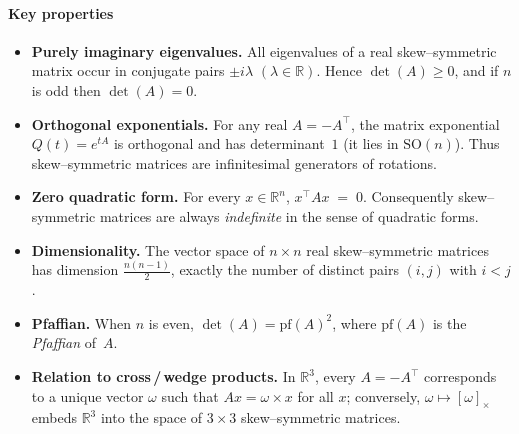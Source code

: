 \paragraph{Key properties}
\begin{itemize}
    \item \textbf{Purely imaginary eigenvalues.}  
          All eigenvalues of a real skew--symmetric matrix occur in conjugate pairs $\pm i\lambda$ $(\lambda \in \mathbb{R})$.  
          Hence $\det(A) \ge 0$, and if $n$ is odd then $\det(A)=0$.
          
    \item \textbf{Orthogonal exponentials.}  
          For any real $A=-A^\top$, the matrix exponential $Q(t)=e^{tA}$ is orthogonal and has determinant~$1$ (it lies in $\mathrm{SO}(n)$).  
          Thus skew--symmetric matrices are infinitesimal generators of rotations.

    \item \textbf{Zero quadratic form.}  
          For every $x\in\mathbb{R}^n$, 
          \(
          x^\top A x \;=\;0.
          \)
          Consequently skew--symmetric matrices are always \emph{indefinite} in the sense of quadratic forms.

    \item \textbf{Dimensionality.}  
          The vector space of $n \times n$ real skew--symmetric matrices has dimension $\tfrac{n(n-1)}{2}$, exactly the number of distinct pairs $(i,j)$ with $i<j$.

    \item \textbf{Pfaffian.}  
          When $n$ is even, $\det(A)=\mathrm{pf}(A)^2$, where $\mathrm{pf}(A)$ is the \emph{Pfaffian} of~$A$.

    \item \textbf{Relation to cross\,/\,wedge products.}  
          In $\mathbb{R}^3$, every $A=-A^\top$ corresponds to a unique vector $\omega$ such that $A x = \omega \times x$ for all $x$; conversely, $\omega \mapsto [\omega]_\times$ embeds $\mathbb{R}^3$ into the space of $3\times 3$ skew--symmetric matrices.
\end{itemize}

